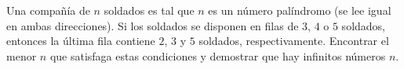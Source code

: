 Una compañía de $n$ soldados es tal que $n$ es un número palíndromo (se lee igual en ambas direcciones). Si los soldados se disponen en filas de $3$, $4$ o $5$ soldados, entonces la última fila contiene $2$, $3$ y $5$ soldados, respectivamente.
Encontrar el menor $n$ que satisfaga estas condiciones y demostrar que hay infinitos números $n$.

